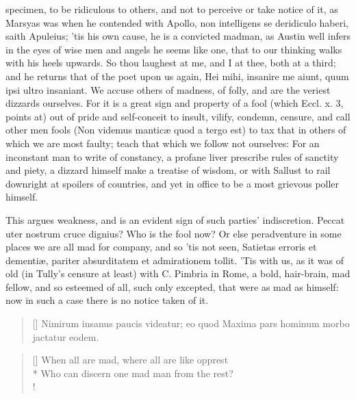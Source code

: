 {specimen, to be ridiculous to others, and not to perceive or take
notice of it, as Marsyas was when he contended with Apollo, non
intelligens se deridiculo haberi, saith  Apuleius; 'tis his own
cause, he is a convicted madman, as Austin well infers in the eyes
of wise men and angels he seems like one, that to our thinking walks
with his heels upwards. So thou laughest at me, and I at thee, both at
a third; and he returns that of the poet upon us again, Hei mihi,
insanire me aiunt, quum ipsi ultro insaniant. We accuse others of
madness, of folly, and are the veriest dizzards ourselves. For it is a
great sign and property of a fool (which Eccl. x. 3, points at) out of
pride and self-conceit to insult, vilify, condemn, censure, and call
other men fools (Non videmus mantic\ae{} quod a tergo est) to tax that in
others of which we are most faulty; teach that which we follow not
ourselves: For an inconstant man to write of constancy, a profane liver
prescribe rules of sanctity and piety, a dizzard himself make a
treatise of wisdom, or with Sallust to rail downright at spoilers of
countries, and yet in office to be a most grievous poller himself.

This argues weakness, and is an evident sign of such parties'
indiscretion. Peccat uter nostrum cruce dignius? Who is the fool
now? Or else peradventure in some places we are all mad for company,
and so 'tis not seen, Satietas erroris et dementi\ae{}, pariter
absurditatem et admirationem tollit. 'Tis with us, as it was of old (in
Tully's censure at least) with C. Pimbria in Rome, a bold,
hair-brain, mad fellow, and so esteemed of all, such only excepted,
that were as mad as himself: now in such a case there is no notice
taken of it.

\settowidth{\versewidth}{Maxima pars hominum morbo jactatur eodem.}
\begin{verse}[\versewidth]
Nimirum insanus paucis videatur; eo quod
Maxima pars hominum morbo jactatur eodem.
\end{verse}

\settowidth{\versewidth}{When all are mad, where all are like opprest}
\begin{verse}[\versewidth]
When all are mad, where all are like opprest\\*
Who can discern one mad man from the rest?\\!
\end{verse}

}
